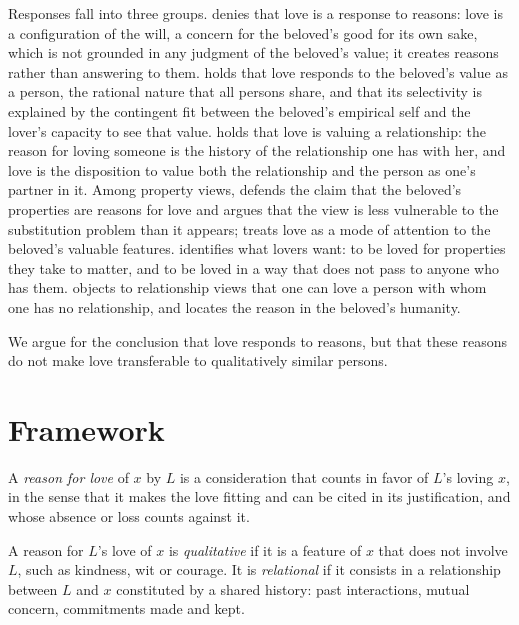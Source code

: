 \documentclass{situationist-preprint}
\begin{document}
Responses fall into three groups. \citet{Frankfurt2004} denies that love is a response to reasons: love is a configuration of the will, a concern for the beloved's good for its own sake, which is not grounded in any judgment of the beloved's value; it creates reasons rather than answering to them. \citet{Velleman1999} holds that love responds to the beloved's value as a person, the rational nature that all persons share, and that its selectivity is explained by the contingent fit between the beloved's empirical self and the lover's capacity to see that value. \citet{Kolodny2003} holds that love is valuing a relationship: the reason for loving someone is the history of the relationship one has with her, and love is the disposition to value both the relationship and the person as one's partner in it. Among property views, \citet{Keller2000} defends the claim that the beloved's properties are reasons for love and argues that the view is less vulnerable to the substitution problem than it appears; \citet{Jollimore2011} treats love as a mode of attention to the beloved's valuable features. \citet{Delaney1996} identifies what lovers want: to be loved for properties they take to matter, and to be loved in a way that does not pass to anyone who has them. \citet{Setiya2014} objects to relationship views that one can love a person with whom one has no relationship, and locates the reason in the beloved's humanity.

We argue for the conclusion that love responds to reasons, but that these reasons do not make love transferable to qualitatively similar persons.

\section{Framework}

\begin{definition}\label{d:reason}
A \emph{reason for love} of $x$ by $L$ is a consideration that counts in favor of $L$'s loving $x$, in the sense that it makes the love fitting and can be cited in its justification, and whose absence or loss counts against it.
\end{definition}

\begin{definition}\label{d:kinds}
A reason for $L$'s love of $x$ is \emph{qualitative} if it is a feature of $x$ that does not involve $L$, such as kindness, wit or courage. It is \emph{relational} if it consists in a relationship between $L$ and $x$ constituted by a shared history: past interactions, mutual concern, commitments made and kept.
\end{definition}
\end{document}

